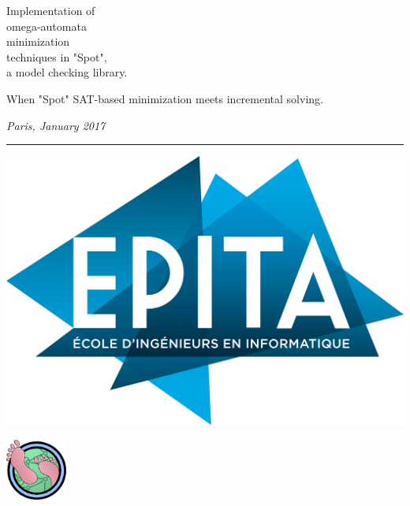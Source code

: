 \begin{titlepage}
\noindent \titlefont Implementation of \\
omega-automata \\
minimization \\
techniques in "Spot", \\
a model checking library.\par
\epigraph{When "Spot" SAT-based minimization meets incremental solving.}%
{\textit{Paris, January 2017}}
\null\vfill
\vspace*{1cm}
\noindent
\hfill%
%
\noindent\begin{minipage}{0.7\textwidth}
    \begin{flushright}
        \printauthor
    \end{flushright}
\end{minipage}%
%
\begin{minipage}{0.1\linewidth}%
  \hspace{0.5cm}%
  \rule{5pt}{200pt}%
\end{minipage}%
%
\begin{minipage}{0.3\textwidth}%
  \includegraphics[width=\linewidth]{./img/epita.png} \\%
  \begin{center}%
    \includegraphics[width=2cm]{./img/spot.png}%
  \end{center}%

\end{minipage}
\end{titlepage}
